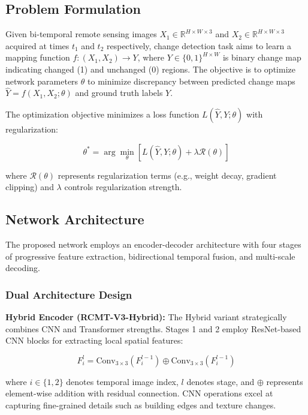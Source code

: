 \documentclass[journal]{IEEEtran}
\begin{document}
\subsection{Problem Formulation}

Given bi-temporal remote sensing images $X_1 \in \mathbb{R}^{H \times W \times 3}$ and $X_2 \in \mathbb{R}^{H \times W \times 3}$ acquired at times $t_1$ and $t_2$ respectively, change detection task aims to learn a mapping function $f: (X_1, X_2) \rightarrow Y$, where $Y \in \{0,1\}^{H \times W}$ is binary change map indicating changed (1) and unchanged (0) regions. The objective is to optimize network parameters $\theta$ to minimize discrepancy between predicted change maps $\hat{Y} = f(X_1, X_2; \theta)$ and ground truth labels $Y$.

The optimization objective minimizes a loss function $L(\hat{Y}, Y; \theta)$ with regularization:

\begin{equation}
\theta^* = \arg\min_\theta \left[ L(\hat{Y}, Y; \theta) + \lambda \mathcal{R}(\theta) \right]
\label{eq:objective}
\end{equation}

where $\mathcal{R}(\theta)$ represents regularization terms (e.g., weight decay, gradient clipping) and $\lambda$ controls regularization strength.

\subsection{Network Architecture}

The proposed network employs an encoder-decoder architecture with four stages of progressive feature extraction, bidirectional temporal fusion, and multi-scale decoding.

\subsubsection{Dual Architecture Design}

\textbf{Hybrid Encoder (RCMT-V3-Hybrid):} The Hybrid variant strategically combines CNN and Transformer strengths. Stages 1 and 2 employ ResNet-based CNN blocks for extracting local spatial features:

\begin{equation}
F_i^l = \text{Conv}_{3\times 3}(F_{i}^{l-1}) \oplus \text{Conv}_{3\times 3}(F_{i}^{l-1})
\label{eq:cnn}
\end{equation}

where $i \in \{1,2\}$ denotes temporal image index, $l$ denotes stage, and $\oplus$ represents element-wise addition with residual connection. CNN operations excel at capturing fine-grained details such as building edges and texture changes.
\end{document}
